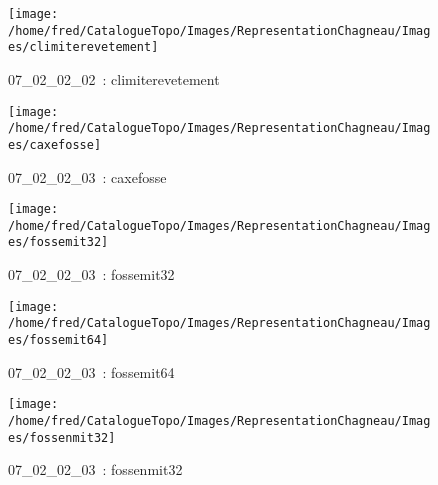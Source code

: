 \documentclass[12pt,titlepage]{book}
\begin{document}
\begin{figure}[h!]
\begin{minipage}[t]{3cm}
\begin{center}
    \end{center}
  \end{minipage}
  \begin{minipage}[t]{3cm}
    \begin{center}
      \texttt{[image: /home/fred/CatalogueTopo/Images/RepresentationChagneau/Images/climiterevetement]}
      \caption[~07\_02\_02\_02]{\small{07\_02\_02\_02~:} \tiny{climiterevetement}}\label{climiterevetement}
    \end{center}
  \end{minipage}
  \begin{minipage}[t]{3cm}
    \begin{center}
      \texttt{[image: /home/fred/CatalogueTopo/Images/RepresentationChagneau/Images/caxefosse]}
      \caption[~07\_02\_02\_03]{\small{07\_02\_02\_03~:} \tiny{caxefosse}}\label{caxefosse}
    \end{center}
  \end{minipage}
  \begin{minipage}[t]{3cm}
    \begin{center}
      \texttt{[image: /home/fred/CatalogueTopo/Images/RepresentationChagneau/Images/fossemit32]}
      \caption[~07\_02\_02\_03]{\small{07\_02\_02\_03~:} \tiny{fossemit32}}\label{fossemit32}
    \end{center}
  \end{minipage}
  \begin{minipage}[t]{3cm}
    \begin{center}
      \texttt{[image: /home/fred/CatalogueTopo/Images/RepresentationChagneau/Images/fossemit64]}
      \caption[~07\_02\_02\_03]{\small{07\_02\_02\_03~:} \tiny{fossemit64}}\label{fossemit64}
    \end{center}
  \end{minipage}
  \begin{minipage}[t]{3cm}
    \begin{center}
      \texttt{[image: /home/fred/CatalogueTopo/Images/RepresentationChagneau/Images/fossenmit32]}
      \caption[~07\_02\_02\_03]{\small{07\_02\_02\_03~:} \tiny{fossenmit32}}\label{fossenmit32}
    \end{center}
  \end{minipage}
  \begin{minipage}[t]{3cm}

\end{minipage}
\end{figure}
\end{document}
